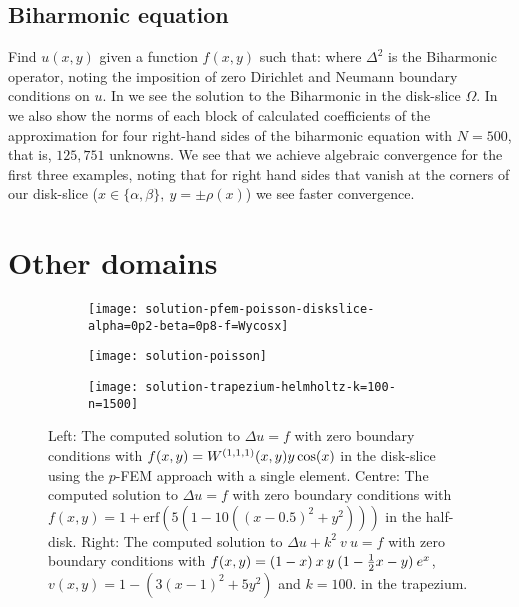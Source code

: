 \subsection{Biharmonic equation}

Find $u(x,y)$ given a function $f(x,y)$ such that:
where $\Delta^2$ is the Biharmonic operator, noting the imposition of zero Dirichlet and Neumann boundary conditions on $u$. In  we see the solution to the Biharmonic  in the disk-slice $\Omega$. In  we also show the norms of each block of calculated coefficients of the approximation for four right-hand sides of the biharmonic equation with $N = 500$, that is, $125,751$ unknowns.  We see that we achieve algebraic convergence for the first three examples, noting that for right hand sides that vanish at the corners of our disk-slice ($x\in\{\alpha,\beta\}, \: y = \pm \rho(x)$) we see faster convergence.


\section{Other domains}

\begin{figure}[t]
	\begin{subfigure}{0.3\textwidth}
	\texttt{[image: solution-pfem-poisson-diskslice-alpha=0p2-beta=0p8-f=Wycosx]}
	\centering
	\end{subfigure}
	\begin{subfigure}{0.3\textwidth}
	\texttt{[image: solution-poisson]}
	\centering
	\end{subfigure}
	\begin{subfigure}{0.3\textwidth}
	\texttt{[image: solution-trapezium-helmholtz-k=100-n=1500]}
	\centering
	\end{subfigure}
	\centering
	\caption{Left: The computed solution to $\Delta u = f$ with zero boundary conditions with $f(x,y) = W^{(1,1,1)}(x,y) y \cos(x)$ in the disk-slice using the $p$-FEM approach with a single element. Centre: The computed solution to $\Delta u = f$ with zero boundary conditions with $f(x,y) = 1 + \text{erf}(5(1 - 10((x - 0.5)^2 + y^2)))$ in the half-disk. Right: The computed solution to $\Delta u + k^2 \: v \: u = f$ with zero boundary conditions with $f(x,y) = (1-x) \: x \: y \: (1- \frac{1}{2} x - y) \: e^x$, $v(x,y) = 1 - (3(x-1)^2 + 5y^2)$ and $k = 100$. in the trapezium.}
	\centering
	\label{fig:ds:trappfem}
\end{figure}

